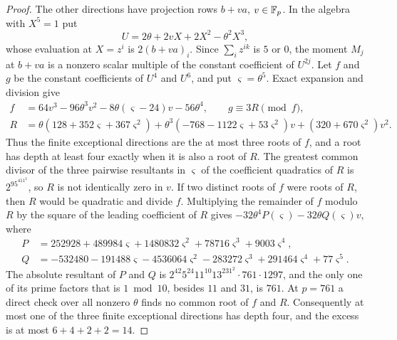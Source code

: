 \begin{proof}
The other directions have projection rows $b+va$, $v\in\mathbb{F}_p$. In the
algebra with $X^5=1$ put
\[
 U=2\theta+2vX+2X^2-\theta^2X^3 ,
\]
whose evaluation at $X=z^i$ is $2(b+va)_i$. Since $\sum_iz^{ik}$ is $5$ or
$0$, the moment $M_j$ at $b+va$ is a nonzero scalar multiple of the
constant coefficient of $U^{2j}$. Let $f$ and $g$ be the constant
coefficients of $U^4$ and $U^6$, and put $\varsigma=\theta^5$. Exact
expansion and division give
\[
\begin{split}
 f&=64v^3-96\theta^3v^2-8\theta(\varsigma-24)v-56\theta^4,\qquad g\equiv3R\pmod f,\\
 R&=\theta(128+352\varsigma+367\varsigma^2)
   +\theta^3(-768-1122\varsigma+53\varsigma^2)v+(320+670\varsigma^2)v^2 .
\end{split}
\]
Thus the finite exceptional directions are the at most three roots of $f$,
and a root has depth at least four exactly when it is also a root of $R$.
The greatest common divisor of the three pairwise resultants in
$\varsigma$ of the coefficient quadratics of $R$ is $2^95^411^2$, so $R$ is
not identically zero in $v$. If two distinct roots of $f$ were roots of
$R$, then $R$ would be quadratic and divide $f$. Multiplying the remainder
of $f$ modulo $R$ by the square of the leading coefficient of $R$ gives
$-32\theta^4P(\varsigma)-32\theta Q(\varsigma)v$, where
\[
\begin{aligned}
 P&=252928+489984\varsigma+1480832\varsigma^2+78716\varsigma^3+9003\varsigma^4,\\
 Q&=-532480-191488\varsigma-4536064\varsigma^2-283272\varsigma^3
   +291464\varsigma^4+77\varsigma^5 .
\end{aligned}
\]
The absolute resultant of $P$ and $Q$ is
$2^{42}5^{24}11^{10}13^231^2\cdot761\cdot1297$, and the only one of its
prime factors that is $1\bmod10$, besides $11$ and $31$, is $761$. At
$p=761$ a direct check over all nonzero $\theta$ finds no common root of
$f$ and $R$. Consequently at most one of the three finite exceptional
directions has depth four, and the excess is at most $6+4+2+2=14$.


\end{proof}
